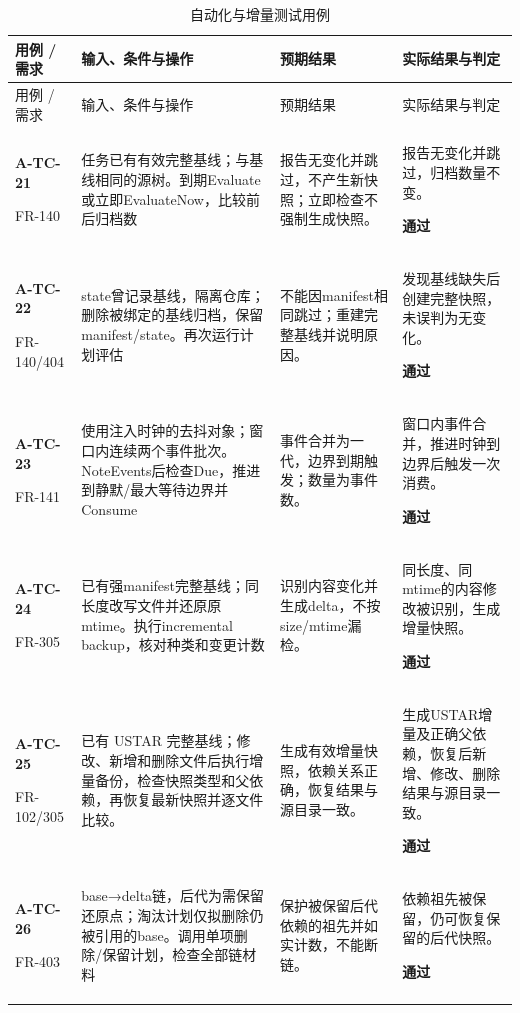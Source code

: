 \begin{longtable}{@{}L{.14\linewidth}L{.36\linewidth}L{.21\linewidth}L{.23\linewidth}@{}}
\caption{自动化与增量测试用例}\label{tab:test-4}\\
\toprule 用例 / 需求 & 输入、条件与操作 & 预期结果 & 实际结果与判定\\\midrule\endfirsthead
\toprule 用例 / 需求 & 输入、条件与操作 & 预期结果 & 实际结果与判定\\\midrule\endhead
\bottomrule\endfoot
\textbf{A-TC-21}\par{\footnotesize FR-140} & 任务已有有效完整基线；与基线相同的源树。到期Evaluate或立即EvaluateNow，比较前后归档数 & 报告无变化并跳过，不产生新快照；立即检查不强制生成快照。 & 报告无变化并跳过，归档数量不变。\par\textbf{通过}\\\addlinespace[2pt]
\textbf{A-TC-22}\par{\footnotesize FR-140/404} & state曾记录基线，隔离仓库；删除被绑定的基线归档，保留manifest/state。再次运行计划评估 & 不能因manifest相同跳过；重建完整基线并说明原因。 & 发现基线缺失后创建完整快照，未误判为无变化。\par\textbf{通过}\\\addlinespace[2pt]
\textbf{A-TC-23}\par{\footnotesize FR-141} & 使用注入时钟的去抖对象；窗口内连续两个事件批次。NoteEvents后检查Due，推进到静默/最大等待边界并Consume & 事件合并为一代，边界到期触发；数量为事件数。 & 窗口内事件合并，推进时钟到边界后触发一次消费。\par\textbf{通过}\\\addlinespace[2pt]
\textbf{A-TC-24}\par{\footnotesize FR-305} & 已有强manifest完整基线；同长度改写文件并还原原mtime。执行incremental backup，核对种类和变更计数 & 识别内容变化并生成delta，不按size/mtime漏检。 & 同长度、同mtime的内容修改被识别，生成增量快照。\par\textbf{通过}\\\addlinespace[2pt]
\textbf{A-TC-25}\par{\footnotesize FR-102/305} & 已有 USTAR 完整基线；修改、新增和删除文件后执行增量备份，检查快照类型和父依赖，再恢复最新快照并逐文件比较。 & 生成有效增量快照，依赖关系正确，恢复结果与源目录一致。 & 生成USTAR增量及正确父依赖，恢复后新增、修改、删除结果与源目录一致。\par\textbf{通过}\\\addlinespace[2pt]
\textbf{A-TC-26}\par{\footnotesize FR-403} & base→delta链，后代为需保留还原点；淘汰计划仅拟删除仍被引用的base。调用单项删除/保留计划，检查全部链材料 & 保护被保留后代依赖的祖先并如实计数，不能断链。 & 依赖祖先被保留，仍可恢复保留的后代快照。\par\textbf{通过}\\\addlinespace[2pt]
\end{longtable}

